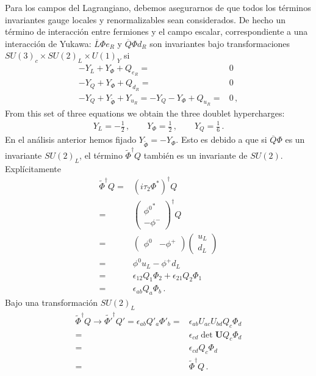 \begin{frame}
Para los campos del Lagrangiano, debemos asegurarnos de que todos los términos invariantes gauge locales y renormalizables sean considerados. De hecho un término de interacción entre fermiones y el campo escalar, correspondiente a una interacción de Yukawa: $\overline{L}\Phi e_R$ y $\overline{Q}\Phi d_R$ son invariantes bajo transformaciones $SU(3)_c\times  SU(2)_L\times  U(1)_Y$ si
\begin{align*}
  -Y_L+Y_\Phi+Q_{e_R}=&0\\
  -Y_Q+Y_\Phi+Q_{d_R}=&0\\
  -Y_Q+Y_{\widetilde{\Phi}}+Y_{u_R}=-Y_Q-Y_{\Phi}+Q_{u_R}=&0\,,
\end{align*}
From this set of three equations we obtain the three doublet hypercharges:
\begin{align}
\label{eq:lhyp}
Y_L=-\frac{1}{2}\,,\qquad Y_\Phi=\frac{1}{2}\,,\qquad Y_Q=\frac{1}{6}\,.
\end{align}
En el análisis anterior hemos fijado $Y_{\widetilde{\Phi}}=-Y_\Phi$. Esto es debido a que  si
$\overline{Q}\Phi$ es un invariante $SU(2)_L$, el término ${\tilde \Phi}^\dagger Q$ también es un invariante de $SU(2)$. Explícitamente
\begin{align}
  \widetilde{\Phi}^\dagger Q=&(i\tau_2\Phi^*)^\dagger Q\nonumber\\
  =& \begin{pmatrix}
    {\phi^0}^*\\
    -\phi^-    
  \end{pmatrix}^\dagger Q\nonumber\\
  =&\begin{pmatrix}
    \phi^0 & -\phi^+
  \end{pmatrix}\begin{pmatrix}
    u_L\\
    d_L
  \end{pmatrix}\nonumber\\
  =&\phi^0 u_L - \phi^+ d_L\nonumber\\
  =&\epsilon_{12}Q_1\Phi_2+\epsilon_{21}Q_2\Phi_1\nonumber\\
  =&\epsilon_{ab}Q_a \Phi_b\,.
\end{align}
Bajo una transformación $SU(2)_L$
\begin{align}
\widetilde{\Phi}^\dagger Q\to {\widetilde{\Phi'}}^\dagger Q'=\epsilon_{ab}Q'_a \Phi'_b=&\epsilon_{ab}U_{ac}U_{bd}Q_c \Phi_d\nonumber\\
  =&\epsilon_{cd}\det\mathbf{U} Q_c \Phi_d\nonumber\\
  =&\epsilon_{cd} Q_c \Phi_d\nonumber\\
  =&\widetilde{\Phi}^\dagger Q\,.
\end{align}


\end{frame}

